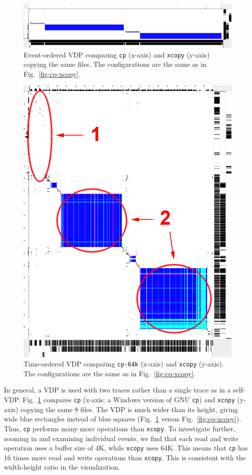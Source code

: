 \begin{figure}[tbh]
\begin{center}
\includegraphics[width=1.0\columnwidth]{lviz/cp-xvc.png}
\caption{Event-ordered VDP comparing {\tt cp} (x-axis) and {\tt xcopy} (y-axis) copying
the same files. 
The configurations are the same as in Fig.~\ref{fig:cp-xcopy}.
}
\label{fig:cp-xvc}
\end{center}
\end{figure}
%
\begin{figure}[htb]
\begin{center}
\includegraphics[width=0.5\columnwidth]{lviz/cp-64k.png}
\caption{Time-ordered VDP comparing {\tt cp-64k} (x-axis)
and {\tt xcopy} (y-axis).
The configurations are the same as in Fig.~\ref{fig:cp-xcopy}.
}
\label{fig:cp-64k}
\end{center}
\end{figure}

In general, a VDP is used with two traces rather than a single
trace as in a self-VDP.
Fig.~\ref{fig:cp-xvc} compares {\tt cp} (x-axis: a Windows version
of GNU {\tt cp}) and {\tt xcopy} (y-axis) copying the same 8 files.
The VDP is much wider than its height, giving
wide blue rectangles instead of blue squares 
(Fig.~\ref{fig:cp-xvc} versus Fig.~\ref{fig:cp-xcopy}).
Thus, {\tt cp} performs many more operations than {\tt xcopy}.
To investigate further, zooming in and examining individual events, 
we find that each read and write operation uses a buffer size of 4K,
while {\tt xcopy} uses 64K.
This means that {\tt cp} has 16 times more read and write operations
than {\tt xcopy}.
This is consistent with the width-height ratio in the visualization.

